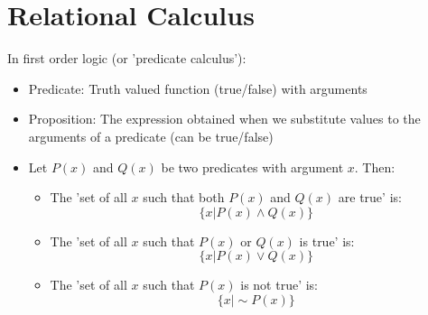 \documentclass{article}[18pt]
\begin{document}
\section{Relational Calculus}
In first order logic (or 'predicate calculus'):
\begin{itemize}
	\item Predicate: Truth valued function (true/false) with arguments
	\item Proposition: The expression obtained when we substitute values to the arguments of a predicate (can be true/false)
	\item Let $P(x)$ and $Q(x)$ be two predicates with argument $x$. Then:
	\begin{itemize}
		\item The 'set of all $x$ such that both $P(x)$ and $Q(x)$ are true' is:
		$$\{x|P(x)\land Q(x)\}$$
		\item The 'set of all $x$ such that $P(x)$ or $Q(x)$ is true' is:
		$$\{x|P(x)\lor Q(x)\}$$
		\item The 'set of all $x$ such that $P(x)$ is not true' is:
		$$\{x|\sim P(x)\}$$ 
	\end{itemize}
\end{itemize}
\end{document}
